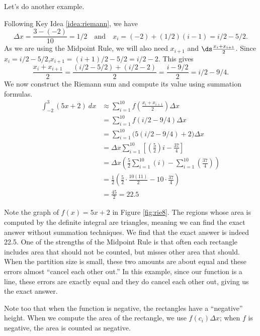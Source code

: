 Let's do another example.\\

{Following Key Idea \ref{idea:riemann}, we have
	$$\Delta x = \frac{3 - (-2)}{10} = 1/2 \quad \text{and} \quad x_i = (-2) + (1/2)(i-1) = i/2-5/2.$$
	As we are using the Midpoint Rule, we will also need $x_{i+1}$ and $\ds \frac{x_i+x_{i+1}}2$. Since $x_i = i/2-5/2$,\quad $x_{i+1} = (i+1)/2 - 5/2 = i/2 -2$.
	This gives 
	$$\frac{x_i+x_{i+1}}2 = \frac{(i/2-5/2) + (i/2-2)}{2} = \frac{i-9/2}{2} = i/2 - 9/4.$$
	We now construct the Riemann sum and compute its value using summation formulas.
\begin{align*}
\int_{-2}^3 (5x+2)\ dx 	&\approx \sum_{i=1}^{10} f\left(\frac{x_i+x_{i+1}}{2}\right)\Delta x \\
												&=	\sum_{i=1}^{10} f(i/2 - 9/4)\Delta x \\
												&=	\sum_{i=1}^{10} \big(5(i/2-9/4) + 2\big)\Delta x\\
												&=	\Delta x\sum_{i=1}^{10}\left[\left(\frac{5}{2}\right)i - \frac{37}{4}\right]\\
												&=	\Delta x\left(\frac{5}2\sum_{i=1}^{10} (i) - \sum_{i=1}^{10}\left(\frac{37}{4}\right)\right) \\
												&= \frac12\left(\frac52\cdot\frac{10(11)}{2} - 10\cdot\frac{37}4\right)  \\
												&= \frac{45}2 = 22.5
\end{align*}

Note the graph of $f(x) = 5x+2$ in Figure \ref{fig:rie8}. The regions whose area is computed by the definite integral are triangles, meaning we can find the exact answer without summation techniques. We find that the exact answer is indeed 22.5. One of the strengths of the Midpoint Rule is that often each rectangle includes area that should not be counted, but misses other area that should. When the partition size is small, these two amounts are about equal and these errors almost ``cancel each other out.'' In this example, since our function is a line, these errors are exactly equal and they do cancel each other out, giving us the exact answer.

Note too that when the function is negative, the rectangles have a ``negative'' height. When we compute the area of the rectangle, we use $f(c_i)\Delta x$; when $f$ is negative, the area is counted as negative.
}\\

